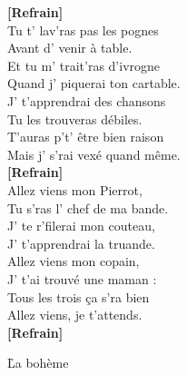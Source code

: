 \documentclass{novel}
\begin{document}
\begin{multicols}{2}
\textbf{[Refrain]} \\

Tu t' lav'ras pas les pognes \\
Avant d' venir à table. \\
Et tu m' trait'ras d'ivrogne \\
Quand j' piquerai ton cartable. \\
J' t'apprendrai des chansons \\
Tu les trouveras débiles. \\
T'auras p't' être bien raison \\
Mais j' s'rai vexé quand même. \\

\textbf{[Refrain]} \\

Allez viens mon Pierrot, \\
Tu s'ras l' chef de ma bande. \\
J' te r'filerai mon couteau, \\
J' t'apprendrai la truande. \\
Allez viens mon copain, \\
J' t'ai trouvé une maman : \\
Tous les trois ça s'ra bien \\
Allez viens, je t'attends. \\

\textbf{[Refrain]} \\

\end{multicols}

\newpage
\normalsize

\h*{La bohème}
\end{document}
